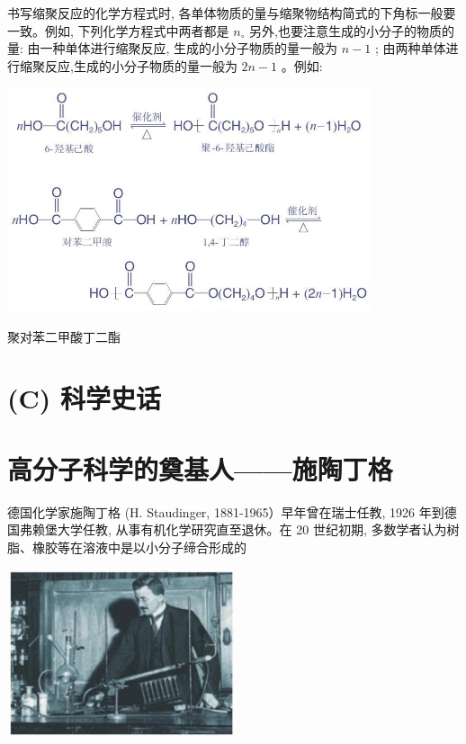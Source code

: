 \documentclass[10pt]{article}
\begin{document}
书写缩聚反应的化学方程式时, 各单体物质的量与缩聚物结构简式的下角标一般要一致。例如, 下列化学方程式中两者都是 \({n}_{ \circ }\) 另外,也要注意生成的小分子的物质的量: 由一种单体进行缩聚反应, 生成的小分子物质的量一般为 \(n - 1\) ; 由两种单体进行缩聚反应,生成的小分子物质的量一般为 \({2n} - 1\) 。例如:

\begin{center}
\includegraphics[max width=0.8\textwidth]{images/0190efc5-b58a-7c43-bfb0-e0a030df9cfd_139_261532.jpg}
\end{center}

聚对苯二甲酸丁二酯

\section*{(C) 科学史话}

\section*{高分子科学的奠基人——施陶丁格}

德国化学家施陶丁格 (H. Staudinger, 1881-1965）早年曾在瑞士任教, 1926 年到德国弗赖堡大学任教, 从事有机化学研究直至退休。在 20 世纪初期, 多数学者认为树脂、橡胶等在溶液中是以小分子缔合形成的

\begin{center}
\includegraphics[max width=0.5\textwidth]{images/0190efc5-b58a-7c43-bfb0-e0a030df9cfd_139_211903.jpg}
\end{center}
\end{document}
